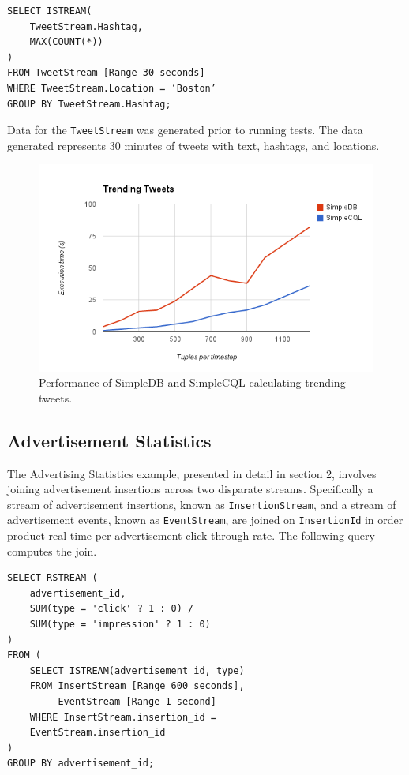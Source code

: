 \documentclass[a4paper, 10pt, conference]{IEEEconf}
\begin{document}
\begin{verbatim}
SELECT ISTREAM(
    TweetStream.Hashtag,
    MAX(COUNT(*))
)
FROM TweetStream [Range 30 seconds]
WHERE TweetStream.Location = ‘Boston’
GROUP BY TweetStream.Hashtag;
\end{verbatim}


Data for the \texttt{TweetStream} was generated prior to running tests.  The data generated represents 30 minutes of tweets with text, hashtags, and locations.  

\begin{figure}[tpH!]
    \centering
    \centerline{\includegraphics[totalheight=5cm]{trending.png}}
    \caption{Performance of SimpleDB and SimpleCQL calculating trending tweets.}
    \label{fig:attack}
\end{figure}

\subsection{Advertisement Statistics}
The Advertising Statistics example, presented in detail in section 2, involves joining advertisement insertions across two disparate streams.  Specifically a stream of advertisement insertions, known as \texttt{InsertionStream}, and a stream of advertisement events, known as \texttt{EventStream}, are joined on \texttt{InsertionId} in order product real-time per-advertisement click-through rate.  The following query computes the join.

\begin{verbatim}
SELECT RSTREAM (
    advertisement_id,
    SUM(type = 'click' ? 1 : 0) / 
    SUM(type = 'impression' ? 1 : 0)
)
FROM (
    SELECT ISTREAM(advertisement_id, type)
    FROM InsertStream [Range 600 seconds], 
         EventStream [Range 1 second] 
    WHERE InsertStream.insertion_id = 
    EventStream.insertion_id
) 
GROUP BY advertisement_id;
\end{verbatim}
\end{document}
